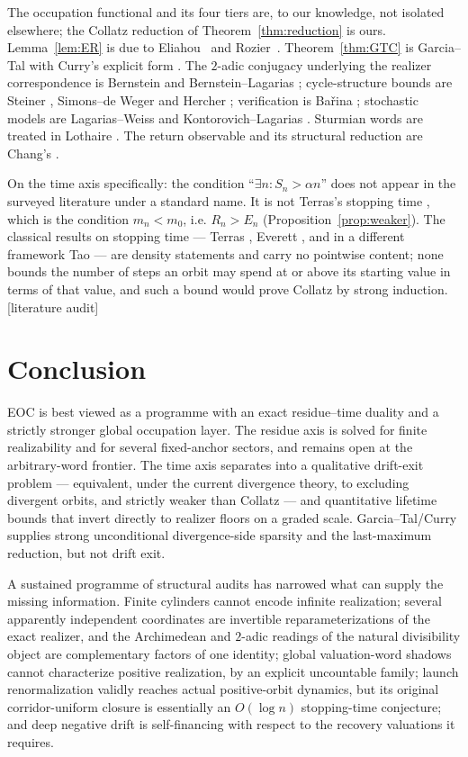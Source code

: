 \documentclass[11pt]{article}
\theoremstyle{plain}
\theoremstyle{definition}
\theoremstyle{remark}
\newcommand{\al}{\alpha}
\newcommand{\status}[1]{\textsf{\footnotesize[#1]}}
\begin{document}
The occupation functional and its four tiers are, to our knowledge, not isolated elsewhere; the
Collatz reduction of Theorem~\ref{thm:reduction} is ours. Lemma~\ref{lem:ER} is due to
Eliahou~\cite{Eliahou} and Rozier~\cite{Rozier}. Theorem~\ref{thm:GTC} is Garcia--Tal
\cite{GarciaTal} with Curry's explicit form \cite{Curry}. The $2$-adic conjugacy underlying the
realizer correspondence is Bernstein \cite{Bernstein} and Bernstein--Lagarias
\cite{BernsteinLagarias}; cycle-structure bounds are Steiner \cite{Steiner}, Simons--de Weger
\cite{SimonsdeWeger} and Hercher \cite{Hercher}; verification is Ba\v{r}ina \cite{Barina};
stochastic models are Lagarias--Weiss \cite{LagariasWeiss} and Kontorovich--Lagarias
\cite{KontorovichLagarias}. Sturmian words are treated in Lothaire \cite{Lothaire}. The return
observable and its structural reduction are Chang's \cite{Chang1,Chang2}.

On the time axis specifically: the condition ``$\exists n:S_n>\al n$'' does not appear in the
surveyed literature under a standard name. It is not Terras's stopping time \cite{Terras}, which is
the condition $m_n<m_0$, i.e. $R_n>E_n$ (Proposition~\ref{prop:weaker}). The classical results on
stopping time --- Terras \cite{Terras}, Everett \cite{Everett}, and in a different framework Tao
\cite{Tao} --- are density statements and carry no pointwise content; none bounds the number of
steps an orbit may spend at or above its starting value in terms of that value, and such a bound
would prove Collatz by strong induction. \status{literature audit}

\section{Conclusion}\label{sec:conclusion}

EOC is best viewed as a programme with an exact residue--time duality and a strictly stronger
global occupation layer. The residue axis is solved for finite realizability and for several
fixed-anchor sectors, and remains open at the arbitrary-word frontier. The time axis separates into
a qualitative drift-exit problem --- equivalent, under the current divergence theory, to excluding
divergent orbits, and strictly weaker than Collatz --- and quantitative lifetime bounds that invert
directly to realizer floors on a graded scale. Garcia--Tal/Curry supplies strong unconditional
divergence-side sparsity and the last-maximum reduction, but not drift exit.

A sustained programme of structural audits has narrowed what can supply the missing information.
Finite cylinders cannot encode infinite realization; several apparently independent coordinates are
invertible reparameterizations of the exact realizer, and the Archimedean and $2$-adic readings of
the natural divisibility object are complementary factors of one identity; global valuation-word
shadows cannot characterize positive realization, by an explicit uncountable family; launch
renormalization validly reaches actual positive-orbit dynamics, but its original corridor-uniform
closure is essentially an $O(\log n)$ stopping-time conjecture; and deep negative drift is
self-financing with respect to the recovery valuations it requires.
\end{document}
